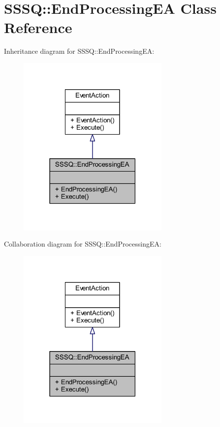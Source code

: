 \hypertarget{class_s_s_s_q_1_1_end_processing_e_a}{}\section{S\+S\+SQ\+:\+:End\+Processing\+EA Class Reference}
\label{class_s_s_s_q_1_1_end_processing_e_a}


Inheritance diagram for S\+S\+SQ\+:\+:End\+Processing\+EA\+:
\nopagebreak
\begin{figure}[H]
\begin{center}
\leavevmode
\includegraphics[width=210pt]{class_s_s_s_q_1_1_end_processing_e_a__inherit__graph}
\end{center}
\end{figure}


Collaboration diagram for S\+S\+SQ\+:\+:End\+Processing\+EA\+:
\nopagebreak
\begin{figure}[H]
\begin{center}
\leavevmode
\includegraphics[width=210pt]{class_s_s_s_q_1_1_end_processing_e_a__coll__graph}
\end{center}
\end{figure}
